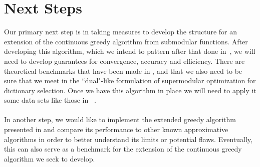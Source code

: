 \documentclass{article}
\begin{document}
\section{Next Steps}
Our primary next step is in taking measures to develop the structure for an extension of the continuous greedy algorithm from submodular functions. After developing this algorithm, which we intend to pattern after that done in~\cite{Singer16TwoStage}, we will need to develop guarantees for convergence, accuracy and efficiency. There are theoretical benchmarks that have been made in \cite{greedy_selection}, \cite{Krause05near-optimalnonmyopic} and \cite{nonconvexrelax} that we also need to be sure that we meet in the ``dual"-like formulation of supermodular optimization for dictionary selection. Once we have this algorithm in place we will need to apply it some data sets like those in ~\cite{Singer16TwoStage}.
\\
\\
In another step, we would like to implement the extended greedy algorithm presented in \cite{BoutsidisLS15} and compare its performance to other known approximative algorithms in order to better understand its limits or potential flaws. Eventually, this can also serve as a benchmark for the extension of the continuous greedy algorithm we seek to develop.



\end{document}
